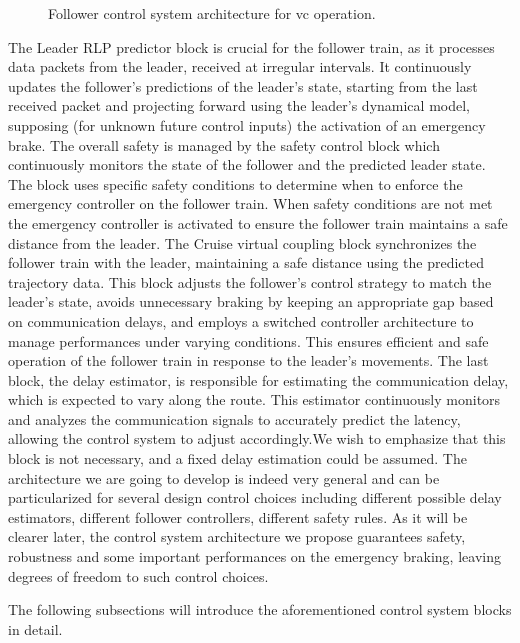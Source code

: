 \documentclass[letterpaper, 10 pt, conference]{ieeeconf}
\theoremstyle{definition}
\theoremstyle{nopoint}
\begin{document}
 
 \begin{figure}[H]
 	\resizebox{\linewidth}{!}{}
 	\caption{Follower control system architecture for \gls{vc} operation. }
 	\label{fig:controlSystem}
 \end{figure}
 
The Leader RLP predictor block is crucial for the follower train, as it processes data packets from the leader, received at irregular intervals. It continuously updates the follower's predictions of the leader's state, starting from the last received packet and projecting forward using the leader’s dynamical model, supposing (for unknown future control inputs) the activation of an emergency brake. The overall safety is managed by the safety control block which continuously monitors the state of the follower and the predicted leader state. The block uses specific safety conditions to determine when to enforce the emergency controller on the follower train. When safety conditions are not met the emergency controller is activated to ensure the follower train maintains a safe distance from the leader. The Cruise virtual coupling block synchronizes the follower train with the leader, maintaining a safe distance using the predicted trajectory data. This block adjusts the follower's control strategy to match the leader's state, avoids unnecessary braking by keeping an appropriate gap based on communication delays, and employs a switched controller architecture to manage performances under varying conditions. This ensures efficient and safe operation of the follower train in response to the leader's movements. The last block, the delay estimator, is responsible for estimating the communication delay, which is expected to vary along the route. This estimator continuously monitors and analyzes the communication signals to accurately predict the latency, allowing the control system to adjust accordingly.We wish to emphasize that this block is not necessary, and a fixed delay estimation could be assumed. The architecture we are going to develop is indeed very general and can be particularized for several design control choices including different possible delay estimators, different follower controllers, different safety rules. As it will be clearer later, the control system architecture we propose guarantees safety, robustness and some important performances on the emergency braking, leaving degrees of freedom to such control choices.
 
The following subsections will introduce the aforementioned control system blocks in detail. 
\end{document}
